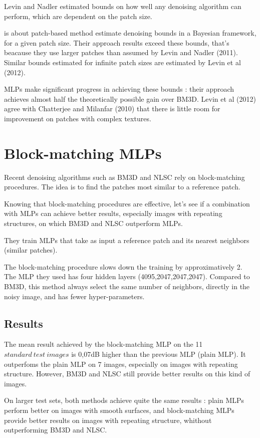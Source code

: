 \documentclass[10pt,a4paper]{article}
\begin{document}
Levin and Nadler estimated bounds on how well any denoising algorithm can perform, which are dependent on the patch size.

is about patch-based method estimate denoising bounds in a Bayesian framework, for a given patch size. Their approach results exceed these bounds, that's beacause they use larger patches than assumed by Levin and Nadler (2011). 
Similar bounds estimated for infinite patch sizes are estimated by Levin et al (2012).

MLPs make significant progress in achieving these bounds : their approach achieves almost half the theoretically possible gain over BM3D. Levin et al (2012) agree with Chatterjee and Milanfar (2010) that there is little room for improvement on patches with complex textures. 

\section{Block-matching MLPs}

Recent denoising algorithms such as BM3D and NLSC rely on block-matching procedures. The idea is to find the patches most similar to a reference patch.

Knowing that block-matching procedures are effective, let's see if a combination with MLPs can achieve better results, especially images with repeating structures, on which BM3D and NLSC outperform MLPs.

They train MLPs that take as input a reference patch and its nearest neighbors (similar patches).

The block-matching procedure slows down the training by approximatively 2. The MLP they used has four hidden layers (4095,2047,2047,2047). Compared to BM3D, this method always select the same number of neighbors, directly in the noisy image, and has fewer hyper-parameters.

\subsection{Results}

The mean result achieved by the block-matching MLP on the 11 $standard\ test\ images$ is 0,07dB higher than the previous MLP (plain MLP). It outperfoms the plain MLP on 7 images, especially on images with repeating structure. However, BM3D and NLSC still provide better results on this kind of images.

On larger test sets, both methods achieve quite the same results : plain MLPs perform better on images with smooth surfaces, and block-matching MLPs provide better results on images with repeating structure, whithout outperforming BM3D and NLSC.
\end{document}
